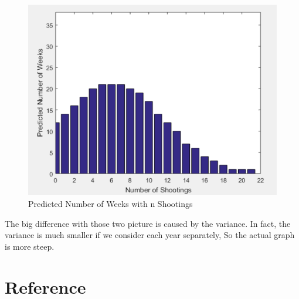 \documentclass{article}
\begin{document}
\begin{figure}[H]
\begin{center}
\includegraphics[width=17cm]{Predicted.png}
\caption{Predicted Number of Weeks with n Shootings}
\end{center}
\end{figure}

The big difference with those two picture is caused by the variance. In fact, the variance is much smaller if we consider each year separately, So the actual graph is more steep.





\section{Reference}
\end{document}
